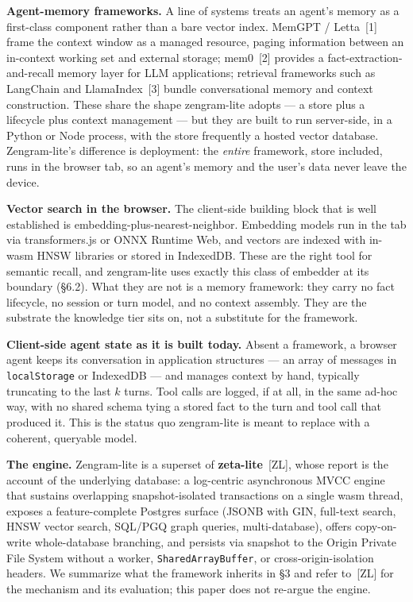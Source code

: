 \documentclass[11pt]{article}
\newcommand{\code}[1]{\texttt{#1}}
\begin{document}
\textbf{Agent-memory frameworks.} A line of systems treats an agent's memory as a
first-class component rather than a bare vector index. MemGPT / Letta~[1] frame
the context window as a managed resource, paging information between an in-context
working set and external storage; mem0~[2] provides a fact-extraction-and-recall
memory layer for LLM applications; retrieval frameworks such as LangChain and
LlamaIndex~[3] bundle conversational memory and context construction. These share
the shape zengram-lite adopts --- a store plus a lifecycle plus context
management --- but they are built to run server-side, in a Python or Node
process, with the store frequently a hosted vector database. Zengram-lite's
difference is deployment: the \emph{entire} framework, store included, runs in the
browser tab, so an agent's memory and the user's data never leave the device.

\textbf{Vector search in the browser.} The client-side building block that is
well established is embedding-plus-nearest-neighbor. Embedding models run in the
tab via transformers.js or ONNX Runtime Web, and vectors are indexed with in-wasm
HNSW libraries or stored in IndexedDB. These are the right tool for semantic
recall, and zengram-lite uses exactly this class of embedder at its boundary
(\S6.2). What they are not is a memory framework: they carry no fact lifecycle, no
session or turn model, and no context assembly. They are the substrate the
knowledge tier sits on, not a substitute for the framework.

\textbf{Client-side agent state as it is built today.} Absent a framework, a
browser agent keeps its conversation in application structures --- an array of
messages in \code{localStorage} or IndexedDB --- and manages context by hand,
typically truncating to the last $k$ turns. Tool calls are logged, if at all, in
the same ad-hoc way, with no shared schema tying a stored fact to the turn and
tool call that produced it. This is the status quo zengram-lite is meant to
replace with a coherent, queryable model.

\textbf{The engine.} Zengram-lite is a superset of \textbf{zeta-lite}~[ZL], whose
report is the account of the underlying database: a log-centric asynchronous MVCC
engine that sustains overlapping snapshot-isolated transactions on a single wasm
thread, exposes a feature-complete Postgres surface (JSONB with GIN, full-text
search, HNSW vector search, SQL/PGQ graph queries, multi-database), offers
copy-on-write whole-database branching, and persists via snapshot to the Origin
Private File System without a worker, \code{SharedArrayBuffer}, or
cross-origin-isolation headers. We summarize what the framework inherits in \S3
and refer to~[ZL] for the mechanism and its evaluation; this paper does not
re-argue the engine.
\end{document}
